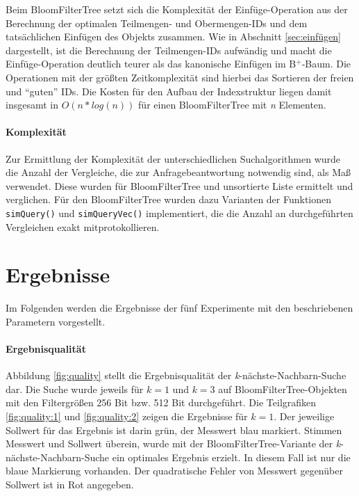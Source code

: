 Beim BloomFilterTree setzt sich die Komplexität der Einfüge-Operation aus der Berechnung der optimalen Teilmengen- und Obermengen-IDs und dem tatsächlichen Einfügen des Objekts zusammen. Wie in Abschnitt \ref{sec:einfügen} dargestellt, ist die Berechnung der Teilmengen-IDs aufwändig und macht die Einfüge-Operation deutlich teurer als das kanonische Einfügen im B$^+$-Baum. Die Operationen mit der größten Zeitkomplexität sind hierbei das Sortieren der freien und "`guten"' IDs. Die Kosten für den Aufbau der Indexstruktur liegen damit insgesamt in $O(n\ast log(n))$ für einen BloomFilterTree mit \textit{n} Elementen. 
\paragraph*{Komplexität}
Zur Ermittlung der Komplexität der unterschiedlichen Suchalgorithmen wurde die Anzahl der Vergleiche, die zur Anfragebeantwortung notwendig sind, als Maß verwendet. Diese wurden für BloomFilterTree und unsortierte Liste ermittelt und verglichen. Für den BloomFilterTree wurden dazu Varianten der Funktionen \texttt{simQuery()} und \texttt{simQueryVec()} implementiert, die die Anzahl an durchgeführten Vergleichen exakt mitprotokollieren.
\newpage
\enlargethispage{2\baselineskip}
\section{Ergebnisse}\label{sec:ergebnisse}
Im Folgenden werden die Ergebnisse der fünf Experimente mit den beschriebenen Parametern vorgestellt. 
\paragraph*{Ergebnisqualität}
Abbildung \ref{fig:quality} stellt die Ergebnisqualität der \textit{k}-nächste-Nachbarn-Su\-che dar. Die Suche wurde jeweils für $k=1$ und $k=3$ auf BloomFilterTree-Objekten mit den Filtergrößen 256 Bit bzw. 512 Bit durchgeführt. Die Teilgrafiken \ref{fig:quality:1} und \ref{fig:quality:2} zeigen die Ergebnisse für $k=1$. Der jeweilige Sollwert für das Ergebnis ist darin grün, der Messwert blau markiert. Stimmen Messwert und Sollwert überein, wurde mit der BloomFilterTree-Variante der \textit{k}-nächste-Nachbarn-Suche ein optimales Ergebnis erzielt. In diesem Fall ist nur die blaue Markierung vorhanden. Der quadratische Fehler von Messwert gegenüber Sollwert ist in Rot angegeben.

